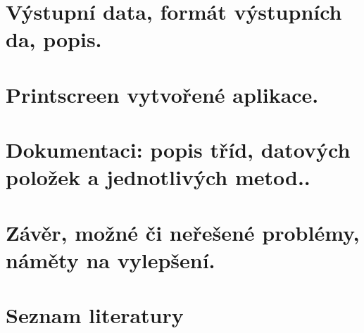 \documentclass[11pt]{article}
\begin{document}
\section{Výstupní data, formát výstupních da, popis.}
\clearpage

\section{Printscreen vytvořené aplikace.}
\clearpage

\section{Dokumentaci: popis tříd, datových položek a jednotlivých metod..}
\clearpage

\section{Závěr, možné či neřešené problémy, náměty na vylepšení.}
\clearpage

\section{Seznam literatury}
\clearpage
\end{document}
